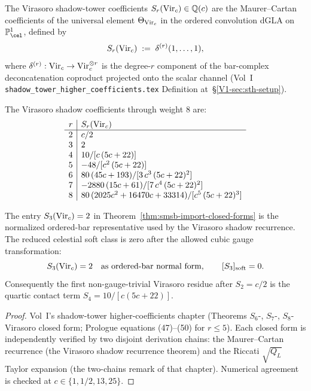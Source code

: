 \begin{definition}
\label{def:smsb-shadow-coeffs}
\ClaimStatusProvedElsewhere
The Virasoro shadow-tower coefficients $S_r(\mathrm{Vir}_c) \in \mathbb Q(c)$ are the
Maurer--Cartan coefficients of the universal element
$\Theta_{\mathrm{Vir}_c}$ in the ordered convolution dGLA on $\PP^1_{\cel}$,
defined by
\[
 S_r(\mathrm{Vir}_c) \;:=\; \delta^{(r)}(1, \ldots, 1),
\]
where $\delta^{(r)} : \mathrm{Vir}_c \to \mathrm{Vir}_c^{\otimes r}$ is the degree-$r$
component of the bar-complex deconcatenation coproduct projected onto
the scalar channel (Vol~I
\texttt{shadow\_tower\_higher\_coefficients.tex}
Definition at~\S\ref{V1-sec:sth-setup}).
\end{definition}

\begin{theorem}[Vol~I closed forms for $S_r(\Vir_c)$, $r = 2, \ldots, 8$]
\label{thm:smsb-import-closed-forms}
\ClaimStatusProvedElsewhere
The Virasoro shadow coefficients through weight $8$ are:
\[
 \begin{array}{r|l}
 r & S_r(\mathrm{Vir}_c) \\ \hline
 2 & c/2 \\
 3 & 2 \\
 4 & 10 / [c\,(5c + 22)] \\
 5 & -48 / [c^{2}\,(5c + 22)] \\
 6 & 80\,(45 c + 193) / [3\, c^{3}\,(5c + 22)^{2}] \\
 7 & -2880\,(15 c + 61) / [7\, c^{4}\,(5c + 22)^{2}] \\
 8 & 80\,(2025 c^{2} + 16470 c + 33314) / [c^{5}\,(5c + 22)^{3}]
 \end{array}
\]
\end{theorem}

\begin{remark}
\label{rem:smsb-s3-raw-versus-soft}
The entry $S_3(\mathrm{Vir}_c)=2$ in
Theorem~\ref{thm:smsb-import-closed-forms} is the normalized
ordered-bar representative used by the Virasoro shadow recurrence.
The reduced celestial soft class is zero after the allowed cubic
gauge transformation:
\[
 S_3(\mathrm{Vir}_c)=2
 \quad\text{as ordered-bar normal form},
 \qquad
 [S_3]_{\mathrm{soft}}=0.
\]
Consequently the first non-gauge-trivial Virasoro residue after
$S_2=c/2$ is the quartic contact term
$S_4=10/[c(5c+22)]$.
\end{remark}

\begin{proof}
Vol~I's shadow-tower higher-coefficients chapter (Theorems
$S_6$-, $S_7$-, $S_8$-Virasoro closed form; Prologue equations
(47)--(50) for $r \leq 5$). Each closed form is independently
verified by two disjoint derivation chains: the Maurer--Cartan
recurrence (the Virasoro shadow recurrence theorem) and the Riccati
$\sqrt{Q_L}$ Taylor expansion (the two-chains remark of that
chapter). Numerical agreement is checked at
$c \in \{1, 1/2, 13, 25\}$.
\end{proof}

